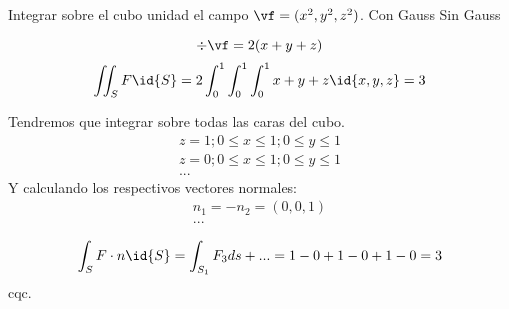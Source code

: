 \begin{problem}[27]
Integrar sobre el cubo unidad el campo $\vf = (x^2,y^2,z^2)$.
\ppart Con Gauss
\ppart Sin Gauss
\solution

\spart
\[\div\vf = 2(x+y+z)\]
\[\iint_S F\id{S} = 2\int_0^1\int_0^1\int_0^1 x+y+z\id{x,y,z} = 3\]


\spart
Tendremos que integrar sobre todas las caras del cubo.
\begin{gather*}
z=1;0\leq x\leq 1; 0\leq y\leq 1\\
z=0;0\leq x\leq 1; 0\leq y\leq 1\\
...
\end{gather*}
Y calculando los respectivos vectores normales: 
\begin{gather*}
n_1=-n_2=(0,0,1)\\
...
\end{gather*}

\[\int_S F\cdot n \id{S} = \int_{S_1} F_3ds + ... = 1-0+1-0+1-0=3\]
cqc.

\end{problem}
